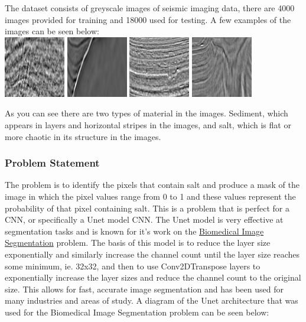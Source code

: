 \documentclass[11pt]{article}
\makeatletter
\def\maxwidth{\ifdim\Gin@nat@width>\linewidth\linewidth
    \else\Gin@nat@width\fi}
\let\Oldincludegraphics\includegraphics
\renewcommand{\includegraphics}[1]{\Oldincludegraphics[width=.8\maxwidth]{#1}}
\makeatother
\begin{document}
The dataset consists of greyscale images of seismic imaging data, there
are 4000 images provided for training and 18000 used for testing. A few
examples of the images can be seen below:\\
\includegraphics{pictures/example_0.png}
\includegraphics{pictures/example_1.png}
\includegraphics{pictures/example_2.png}
\includegraphics{pictures/example_3.png}

As you can see there are two types of material in the images. Sediment,
which appears in layers and horizontal stripes in the images, and salt,
which is flat or more chaotic in its structure in the images.

\subsubsection{Problem Statement}\label{problem-statement}

The problem is to identify the pixels that contain salt and produce a
mask of the image in which the pixel values range from 0 to 1 and these
values represent the probability of that pixel containing salt. This is
a problem that is perfect for a CNN, or specifically a Unet model CNN.
The Unet model is very effective at segmentation tasks and is known for
it's work on the
\href{https://lmb.informatik.uni-freiburg.de/people/ronneber/u-net/}{Biomedical
Image Segmentation} problem. The basis of this model is to reduce the
layer size exponentially and similarly increase the channel count until
the layer size reaches some minimum, ie. 32x32, and then to use
Conv2DTranspose layers to exponentially increase the layer sizes and
reduce the channel count to the original size. This allows for fast,
accurate image segmentation and has been used for many industries and
areas of study. A diagram of the Unet architecture that was used for the
Biomedical Image Segmentation problem can be seen below:
\end{document}

